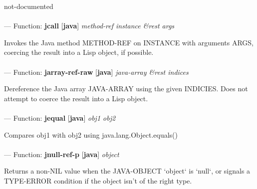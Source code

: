 \begin{adjustwidth}{5em}{5em}
not-documented
\end{adjustwidth}

\paragraph{}
\label{JAVA:JCALL}
--- Function: \textbf{jcall} [\textbf{java}] \textit{method-ref instance \&rest args}

\begin{adjustwidth}{5em}{5em}
Invokes the Java method METHOD-REF on INSTANCE with arguments ARGS, coercing the result into a Lisp object, if possible.
\end{adjustwidth}

\paragraph{}
\label{JAVA:JARRAY-REF-RAW}
--- Function: \textbf{jarray-ref-raw} [\textbf{java}] \textit{java-array \&rest indices}

\begin{adjustwidth}{5em}{5em}
Dereference the Java array JAVA-ARRAY using the given INDICIES. Does not attempt to coerce the result into a Lisp object.
\end{adjustwidth}

\paragraph{}
\label{JAVA:JEQUAL}
--- Function: \textbf{jequal} [\textbf{java}] \textit{obj1 obj2}

\begin{adjustwidth}{5em}{5em}
Compares obj1 with obj2 using java.lang.Object.equals()
\end{adjustwidth}

\paragraph{}
\label{JAVA:JNULL-REF-P}
--- Function: \textbf{jnull-ref-p} [\textbf{java}] \textit{object}

\begin{adjustwidth}{5em}{5em}
Returns a non-NIL value when the JAVA-OBJECT `object` is `null`,
or signals a TYPE-ERROR condition if the object isn't of
the right type.
\end{adjustwidth}

